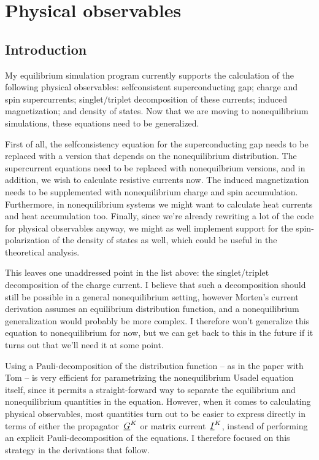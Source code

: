 \chapter{Physical observables}
\section{Introduction}
My equilibrium simulation program currently supports the calculation of the following physical observables:
  selfconsistent superconducting gap;
  charge and spin supercurrents;
  singlet/triplet decomposition of these currents;
  induced magnetization;
  and density of states.
Now that we are moving to nonequilibrium simulations, these equations need to be generalized.

First of all, the selfconsistency equation for the superconducting gap needs to be replaced with a version that depends on the nonequilibrium distribution.
The supercurrent equations need to be replaced with nonequilbrium versions, and in addition, we wish to calculate resistive currents now.
The induced magnetization needs to be supplemented with nonequilibrium charge and spin accumulation.
Furthermore, in nonequilibrium systems we might want to calculate heat currents and heat accumulation too.
Finally, since we're already rewriting a lot of the code for physical observables anyway, we might as well implement support for the spin-polarization of the density of states as well, which could be useful in the theoretical analysis.

This leaves one unaddressed point in the list above: the singlet/triplet decomposition of the charge current.
I believe that such a decomposition should still be possible in a general nonequilibrium setting, however Morten's current derivation assumes an equilibrium distribution function, and a nonequilibrium generalization would probably be more complex.
I therefore won't generalize this equation to nonequilibrium for now, but we can get back to this in the future if it turns out that we'll need it at some point.

Using a Pauli-decomposition of the distribution function -- as in the paper with Tom -- is very efficient for parametrizing the nonequilibrium Usadel equation itself, since it permits a straight-forward way to separate the equilibrium and nonequilibrium quantities in the equation.
However, when it comes to calculating physical observables, most quantities turn out to be easier to express directly in terms of either the propagator~$\underline{G}^K$ or matrix current~$\underline{I}^K$, instead of performing an explicit Pauli-decomposition of the equations.
I therefore focused on this strategy in the derivations that follow.



